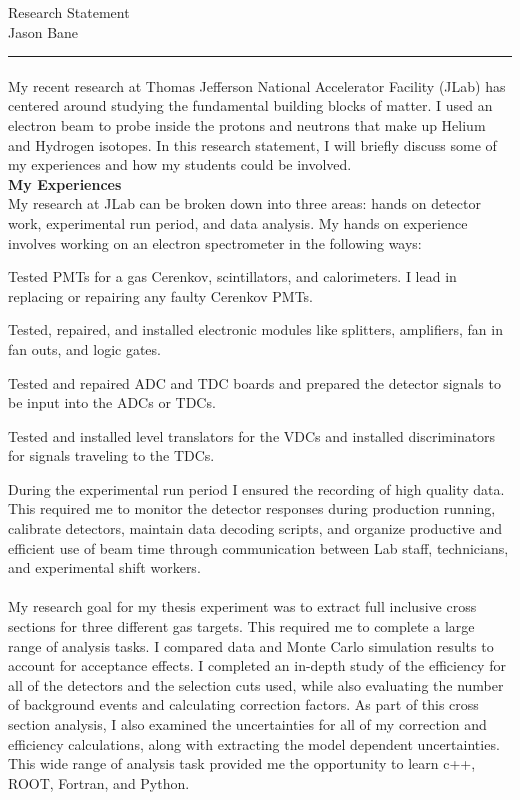 \documentclass[12pt,letterpaper]{article}
\begin{document}
\begin{center}	
	{\huge  Research Statement}\\
	{\large Jason Bane}
\end{center}
\hrule
\paragraph{}My recent research at Thomas Jefferson National Accelerator Facility (JLab) has centered around studying the fundamental building blocks of matter. I used an electron beam to probe inside the protons and neutrons that make up Helium and Hydrogen isotopes. In this research statement, I will briefly discuss some of my experiences and how my students could be involved. \\

\noindent\textbf{My Experiences}\\
\indent My research at JLab can be broken down into three areas: hands on detector work, experimental run period, and data analysis. My hands on experience involves working on an electron spectrometer in the following ways:
\begin{itemize*}
\item Tested PMTs for a gas Cerenkov, scintillators, and calorimeters. I lead in replacing or repairing any faulty Cerenkov PMTs.
\item Tested, repaired, and installed electronic modules like splitters, amplifiers, fan in fan outs, and logic gates. 
\item Tested and repaired ADC and TDC boards and prepared the detector signals to be input into the ADCs or TDCs. 
\item  Tested and installed level translators for the VDCs and installed discriminators for signals traveling to the TDCs.
\end{itemize*}
\vspace*{-10pt}
During the experimental run period I ensured the recording of high quality data. This required me to monitor the detector responses during production running, calibrate detectors, maintain data decoding scripts, and organize productive and efficient use of beam time through communication between Lab staff, technicians, and experimental shift workers.
\vspace*{-10pt}
\paragraph{}My research goal for my thesis experiment was to extract full inclusive cross sections for three different gas targets. This required me to complete a large range of analysis tasks. I compared data and Monte Carlo simulation results to account for acceptance effects. I completed an in-depth study of the efficiency for all of the detectors and the selection cuts used, while also evaluating the number of background events and calculating correction factors. As part of this cross section analysis, I also examined the uncertainties for all of my correction and efficiency calculations, along with extracting the model dependent uncertainties. This wide range of analysis task provided me the opportunity to learn c++, ROOT, Fortran, and Python.\\
\end{document}
